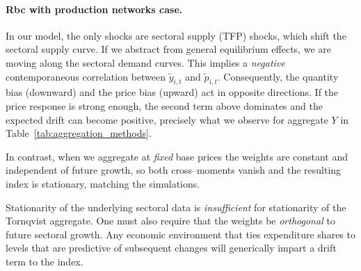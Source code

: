 \documentclass[12pt,english]{article}
\begin{document}
\paragraph{Rbc with production networks case.}
In our model, the only shocks are sectoral supply (TFP) shocks, which shift the sectoral supply curve. If we abstract from general equilibrium effects, we are moving along the sectoral demand curves. This implies a \emph{negative} contemporaneous correlation between
$\tilde{y}_{i,t}$ and $\tilde{p}_{i,t}$.  Consequently, the quantity bias
(downward) and the price bias (upward) act in opposite directions.  If
the price response is strong enough, the second term above dominates and
the expected drift can become positive, precisely what we observe for
aggregate $Y$ in Table~\ref{tab:aggregation_methods}.

In contrast, when we aggregate at \emph{fixed} base prices the weights are
constant and independent of future growth, so both cross--moments vanish
and the resulting index is stationary, matching the simulations.

Stationarity of the underlying sectoral data is
\emph{insufficient} for stationarity of the Tornqvist aggregate.  One
must also require that the weights be \emph{orthogonal} to future sectoral
growth.  Any economic environment that ties expenditure shares to levels
that are predictive of subsequent changes will generically impart a drift
term to the index.
\end{document}
